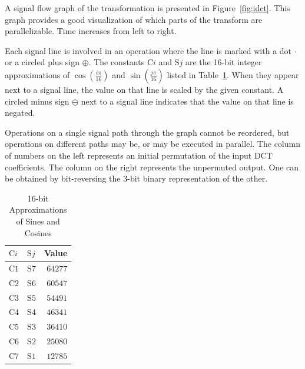 \documentclass[9pt,letterpaper]{book}
\newcommand{\locvar}[1]{\ensuremath{\mathrm{#1}}}
\numberwithin{equation}{chapter}
\numberwithin{figure}{chapter}
\numberwithin{table}{chapter}
\begin{document}
A signal flow graph of the transformation is presented in
 Figure~\ref{fig:idct}.
This graph provides a good visualization of which parts of the transform are
 parallelizable.
Time increases from left to right.

Each signal line is involved in an operation where the line is marked with a
 dot $\cdot$ or a circled plus sign $\oplus$.
The constants $\locvar{C}i$ and $\locvar{S}j$ are the 16-bit integer
 approximations of $\cos(\frac{i\pi}{16})$ and $\sin(\frac{j\pi}{16})$ listed
 in Table~\ref{tab:dct-consts}.
When they appear next to a signal line, the value on that line is scaled by the
 given constant.
A circled minus sign $\ominus$ next to a signal line indicates that the value
 on that line is negated.

Operations on a single signal path through the graph cannot be reordered, but
 operations on different paths may be, or may be executed in parallel.
The column of numbers on the left represents an initial permutation of the
 input DCT coefficients.
The column on the right represents the unpermuted output.
One can be obtained by bit-reversing the 3-bit binary representation of the
 other.

\begin{table}[htbp]
\begin{center}
\begin{tabular}{llr}\toprule
$\locvar{C}i$  & $\locvar{S}j$ & Value   \\\midrule
$\locvar{C1}$  & $\locvar{S7}$ & $64277$ \\
$\locvar{C2}$  & $\locvar{S6}$ & $60547$ \\
$\locvar{C3}$  & $\locvar{S5}$ & $54491$ \\
$\locvar{C4}$  & $\locvar{S4}$ & $46341$ \\
$\locvar{C5}$  & $\locvar{S3}$ & $36410$ \\
$\locvar{C6}$  & $\locvar{S2}$ & $25080$ \\
$\locvar{C7}$  & $\locvar{S1}$ & $12785$ \\
\bottomrule\end{tabular}
\end{center}
\caption{16-bit Approximations of Sines and Cosines}
\label{tab:dct-consts}
\end{table}
\end{document}
